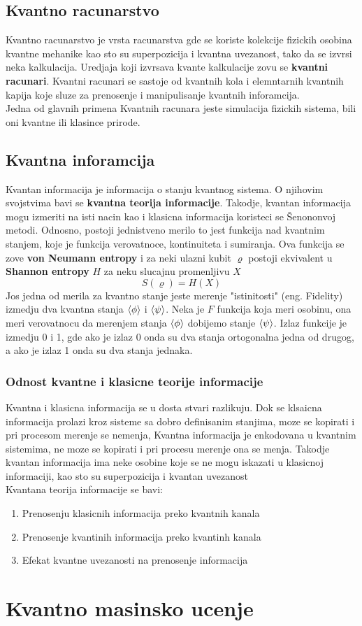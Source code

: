 \documentclass[12pt, letterpaper, oneside]{article}
\begin{document}
\subsection{Kvantno racunarstvo}
Kvantno racunarstvo je vrsta racunarstva gde se koriste kolekcije fizickih osobina kvantne mehanike kao sto su superpozicija i kvantna uvezanost,
tako da se izvrsi neka kalkulacija. Uredjaja koji izvrsava kvante kalkulacije zovu se \textbf{kvantni racunari}.
Kvantni racunari se sastoje od kvantnih kola i elemntarnih kvantnih kapija koje sluze za prenosenje i manipulisanje kvantnih inforamcija.
\cite{nielsen_chuang_10th} \\
Jedna od glavnih primena Kvantnih racunara jeste simulacija fizickih sistema, bili oni kvantne ili klasince prirode.
\subsection{Kvantna inforamcija}
Kvantan informacija je informacija o stanju kvantnog sistema. O njihovim svojstvima bavi se \textbf{kvantna teorija informacije}.
Takodje, kvantan informacija mogu izmeriti na isti nacin kao i klasicna informacija koristeci se Šenononvoj metodi. 
Odnosno, postoji jednistveno merilo to jest funkcija nad kvantnim stanjem, koje je funkcija verovatnoce, kontinuiteta i sumiranja.\cite{vlatko_v}
Ova funkcija se zove \textbf{von Neumann entropy} i za neki ulazni kubit $\varrho$ postoji ekvivalent u  \textbf{Shannon entropy} $H$
za neku slucajnu promenljivu $X$
\[
    S(\varrho) = H(X)
\]
Jos jedna od merila za kvantno stanje jeste merenje "istinitosti" (eng. Fidelity) izmedju dva kvantna stanja $ \braket{\phi}$ i $\braket{\psi}$.
Neka je $F$ funkcija koja meri osobinu, ona meri verovatnocu da merenjem stanja $\braket{\phi}$ dobijemo stanje $\braket{\psi}$.
Izlaz funkcije je izmedju 0 i 1, gde ako je izlaz 0 onda su dva stanja ortogonalna jedna od drugog, a ako je izlaz 1 onda su dva stanja jednaka.\cite{vlatko_v}
\subsubsection*{Odnost kvantne i klasicne teorije informacije}
Kvantna i klasicna informacija se u dosta stvari razlikuju. Dok se klsaicna informacija prolazi kroz sisteme sa dobro definisanim stanjima, moze se kopirati i pri procesom merenje se nemenja,
Kvantna informacija je enkodovana u kvantnim sistemima, ne moze se kopirati i pri procesu merenje ona se menja. Takodje kvantan informacija ima neke osobine koje se ne
mogu iskazati u klasicnoj informaciji, kao sto su superpozicija i kvantan uvezanost \cite{Classical&quantum_info} \\
Kvantana teorija informacije se bavi: 
\begin{enumerate}
    \item Prenosenju klasicnih informacija preko kvantnih kanala
    \item Prenosenje kvantinih informacija preko kvantinh kanala
    \item Efekat kvantne uvezanosti na prenosenje informacija
\end{enumerate}
\section{Kvantno masinsko ucenje}

\newpage
\printbibliography
\end{document}

